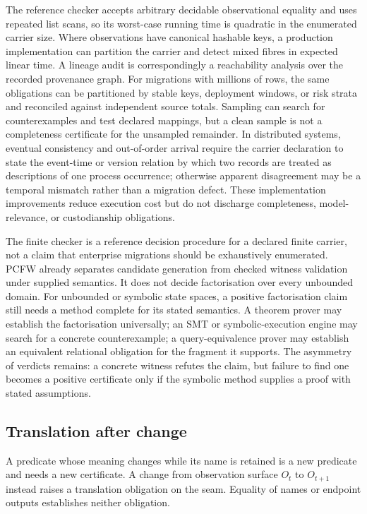\documentclass[smallextended,envcountsect,envcountsame,natbib]{svjour3}
\begin{document}
The reference checker accepts arbitrary decidable observational equality and uses repeated list scans, so its worst-case running time is quadratic in the enumerated carrier size. Where observations have canonical hashable keys, a production implementation can partition the carrier and detect mixed fibres in expected linear time. A lineage audit is correspondingly a reachability analysis over the recorded provenance graph. For migrations with millions of rows, the same obligations can be partitioned by stable keys, deployment windows, or risk strata and reconciled against independent source totals. Sampling can search for counterexamples and test declared mappings, but a clean sample is not a completeness certificate for the unsampled remainder. In distributed systems, eventual consistency and out-of-order arrival require the carrier declaration to state the event-time or version relation by which two records are treated as descriptions of one process occurrence; otherwise apparent disagreement may be a temporal mismatch rather than a migration defect. These implementation improvements reduce execution cost but do not discharge completeness, model-relevance, or custodianship obligations.

The finite checker is a reference decision procedure for a declared finite carrier, not a claim that enterprise migrations should be exhaustively enumerated. PCFW already separates candidate generation from checked witness validation under supplied semantics. It does not decide factorisation over every unbounded domain. For unbounded or symbolic state spaces, a positive factorisation claim still needs a method complete for its stated semantics. A theorem prover may establish the factorisation universally; an SMT or symbolic-execution engine may search for a concrete counterexample; a query-equivalence prover may establish an equivalent relational obligation for the fragment it supports. The asymmetry of verdicts remains: a concrete witness refutes the claim, but failure to find one becomes a positive certificate only if the symbolic method supplies a proof with stated assumptions.

\subsection{Translation after change}\label{ex:sec:debt-extensions}

A predicate whose meaning changes while its name is retained is a new predicate and needs a new certificate. A change from observation surface $O_t$ to $O_{t+1}$ instead raises a translation obligation on the seam. Equality of names or endpoint outputs establishes neither obligation.
\end{document}
